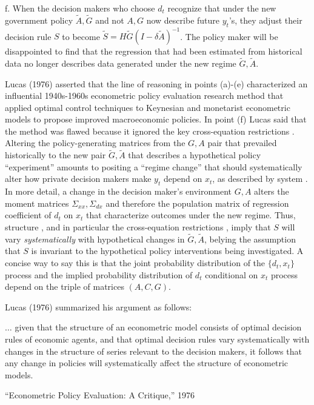 \medskip

\item{f.} When  the  decision makers who choose $d_t$ recognize that under the new government policy  $\tilde A, \tilde G$ and not $A, G$ now  describe future $y_t$'s, they adjust their  decision rule $S$  to become 
 $\tilde S = H \tilde G (I - \delta \tilde A)^{-1}$. The  policy maker will be disappointed to find that the regression that had been  estimated from  historical data  no longer  describes data generated
under the new regime $\tilde G, \tilde A$.

\medskip

Lucas (1976) asserted  that the  line of reasoning in points (a)-(e)    characterized an influential  1940s-1960s econometric policy evaluation
research method that  applied optimal control techniques to Keynesian and monetarist
econometric models to propose  improved  macroeconomic policies. 
In point (f) Lucas said that the method was flawed because it  ignored
 the key cross-equation restrictions . Altering the policy-generating
matrices from the $G, A$ pair that prevailed historically to the new pair  $\tilde G, \tilde A$ that describes a  hypothetical policy ``experiment'' 
  amounts to   positing a  ``regime change'' that
 should   systematically  alter how private decision makers make  $y_t$ depend on $x_t$, as
 described by
 system .  %
 In more detail, a 
 change in the decision maker's  environment $G, A$   alters the moment matrices
$ \Sigma_{xx}, \Sigma_{dx}$ and therefore the population  matrix of regression coefficient of  $d_t$ on $x_t$ that characterize outcomes
under the new  regime. Thus,  structure , and in particular the cross-equation restrictions ,
imply that $S$ will vary {\it systematically\/} with  hypothetical changes
in  $\tilde G, \tilde A$, belying the assumption that $S$ is invariant to the hypothetical policy interventions being investigated.
A concise way to say this is that the joint probability distribution of the $\{d_t, x_t\}$ process and the implied
  probability distribution
of $d_t$ conditional on  $x_t$ process  depend on the  triple of matrices $(A, C, G)$.

Lucas (1976) summarized his argument as follows:

\epigraph{$\ldots$ given that the structure of an econometric model consists of optimal decision rules of economic agents, and
that optimal decision rules vary systematically with changes in the structure of series relevant to the decision makers, it follows
that any change in policies will systematically affect the structure of econometric models.}{``Econometric Policy Evaluation: A Critique,'' 1976}


